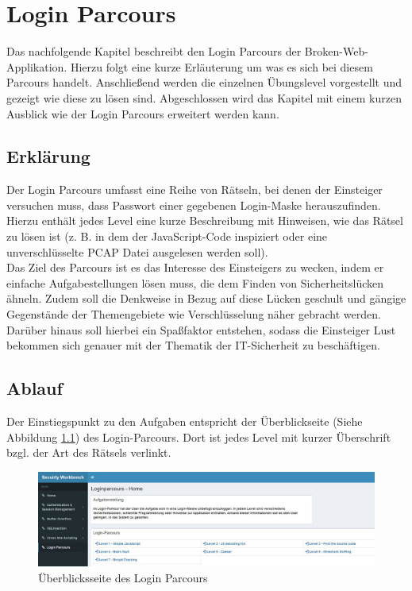 \chapter{Login Parcours}
Das nachfolgende Kapitel beschreibt den Login Parcours der Broken-Web-Applikation. Hierzu folgt eine kurze Erläuterung um was es sich bei diesem Parcours handelt. Anschließend werden die einzelnen Übungslevel vorgestellt und gezeigt wie diese zu lösen sind. Abgeschlossen wird das Kapitel mit einem kurzen Ausblick  wie der Login Parcours erweitert werden kann. 

\section{Erklärung}
Der Login Parcours umfasst eine Reihe von Rätseln, bei denen der Einsteiger versuchen muss, dass Passwort einer gegebenen Login-Maske herauszufinden. Hierzu enthält jedes Level eine kurze Beschreibung mit Hinweisen, wie das Rätsel zu lösen ist (z. B. in dem der JavaScript-Code inspiziert oder eine unverschlüsselte PCAP Datei ausgelesen werden soll). \\ 
Das Ziel des Parcours ist es das Interesse des Einsteigers zu wecken, indem er einfache Aufgabestellungen lösen muss, die dem Finden von Sicherheitslücken ähneln. Zudem soll die Denkweise in Bezug auf diese Lücken geschult und gängige Gegenstände der Themengebiete wie Verschlüsselung näher gebracht werden. Darüber hinaus soll hierbei ein Spaßfaktor entstehen, sodass die Einsteiger Lust bekommen sich genauer mit der Thematik der IT-Sicherheit zu beschäftigen. 

\section{Ablauf}
Der Einstiegspunkt zu den Aufgaben entspricht der Überblickseite (Siehe Abbildung \ref{fig:login-parcours-hauptseite}) des Login-Parcours. Dort ist jedes Level mit kurzer Überschrift bzgl. der Art des Rätsels verlinkt.

\begin{figure}[H]
	\centering
	\includegraphics[width=\textwidth]{images/LoginParcours/login_parcours_hauptseite.jpg}
	\caption{Überblicksseite des Login Parcours}
	\label{fig:login-parcours-hauptseite}
\end{figure}


